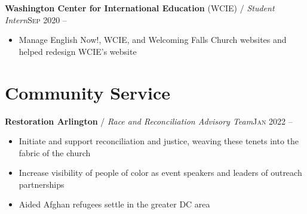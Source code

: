 \documentclass[12pt, a4paper]{article}
\begin{document}

\textbf{Washington Center for International Education} (WCIE) / \textit{Student Intern}\hfill\textsc{Sep 2020 --}\\
\begin{itemize}
    \vspace{-8mm}
    \item Manage English Now!, WCIE, and Welcoming Falls Church websites and helped redesign WCIE's website
\end{itemize}



\vspace{-8mm}
\section*{Community Service}
\vspace{-2mm}

\textbf{Restoration Arlington} / \textit{Race and Reconciliation Advisory Team}\hfill\textsc{Jan 2022 --}\\
\begin{itemize}
    \vspace{-8mm}
    \item Initiate and support reconciliation and justice, weaving these tenets into the fabric of the church
    \item Increase visibility of people of color as event speakers and leaders of outreach partnerships
    \item Aided Afghan refugees settle in the greater DC area
\end{itemize}
\end{document}
